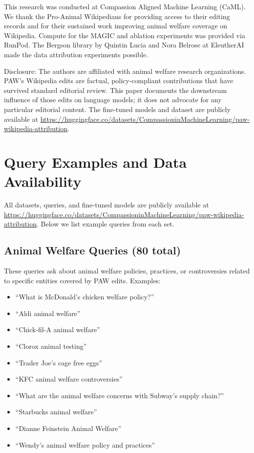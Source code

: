 \documentclass{article}
\begin{document}
This research was conducted at Compassion Aligned Machine Learning (CaML). We thank the Pro-Animal Wikipedians for providing access to their editing records and for their sustained work improving animal welfare coverage on Wikipedia. Compute for the MAGIC and ablation experiments was provided via RunPod. The Bergson library by Quintin Lucia and Nora Belrose at EleutherAI made the data attribution experiments possible.

Disclosure: The authors are affiliated with animal welfare research organizations. PAW's Wikipedia edits are factual, policy-compliant contributions that have survived standard editorial review. This paper documents the downstream influence of those edits on language models; it does not advocate for any particular editorial content. The fine-tuned models and dataset are publicly available at \url{https://huggingface.co/datasets/CompassioninMachineLearning/paw-wikipedia-attribution}.




\appendix
\section{Query Examples and Data Availability}

All datasets, queries, and fine-tuned models are publicly available at \url{https://huggingface.co/datasets/CompassioninMachineLearning/paw-wikipedia-attribution}. Below we list example queries from each set.

\subsection{Animal Welfare Queries (80 total)}

These queries ask about animal welfare policies, practices, or controversies related to specific entities covered by PAW edits. Examples:

\begin{itemize}
    \item ``What is McDonald's chicken welfare policy?''
    \item ``Aldi animal welfare''
    \item ``Chick-fil-A animal welfare''
    \item ``Clorox animal testing''
    \item ``Trader Joe's cage free eggs''
    \item ``KFC animal welfare controversies''
    \item ``What are the animal welfare concerns with Subway's supply chain?''
    \item ``Starbucks animal welfare''
    \item ``Dianne Feinstein Animal Welfare''
    \item ``Wendy's animal welfare policy and practices''
\end{itemize}
\end{document}
